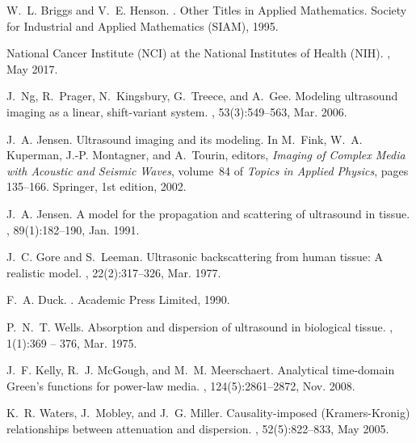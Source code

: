 \documentclass[10pt,twocolumn,romanappendices,final]{IEEEtran}
\begin{document}
\begin{thebibliography}{100}
W.~L. Briggs and V.~E. Henson.
.
\newblock Other Titles in Applied Mathematics. Society for Industrial and
  Applied Mathematics (SIAM), 1995.

{National Cancer Institute ({NCI}) at the National Institutes of Health ({NIH})}.
, May 2017.

J.~Ng, R.~Prager, N.~Kingsbury, G.~Treece, and A.~Gee.
\newblock Modeling ultrasound imaging as a linear, shift-variant system.
,
  53(3):549--563, Mar. 2006.

J.~A. Jensen.
\newblock Ultrasound imaging and its modeling.
\newblock In M.~Fink, W.~A. Kuperman, J.-P. Montagner, and A.~Tourin, editors,
  {\em Imaging of Complex Media with Acoustic and Seismic Waves}, volume~84 of
  {\em Topics in Applied Physics}, pages 135--166. Springer, 1st edition, 2002.

J.~A. Jensen.
\newblock A model for the propagation and scattering of ultrasound in tissue.
, 89(1):182--190, Jan. 1991.

J.~C. Gore and S.~Leeman.
\newblock Ultrasonic backscattering from human tissue: {A} realistic model.
, 22(2):317--326, Mar. 1977.

F.~A. Duck.
.
\newblock Academic Press Limited, 1990.

P.~N.~T. Wells.
\newblock Absorption and dispersion of ultrasound in biological tissue.
, 1(1):369 -- 376, Mar. 1975.

J.~F. Kelly, R.~J. McGough, and M.~M. Meerschaert.
\newblock Analytical time-domain {G}reen's functions for power-law media.
, 124(5):2861--2872, Nov. 2008.

K.~R. Waters, J.~Mobley, and J.~G. Miller.
\newblock Causality-imposed ({K}ramers-{K}ronig) relationships between
  attenuation and dispersion.
,
  52(5):822--833, May 2005.


\end{thebibliography}
\end{document}
